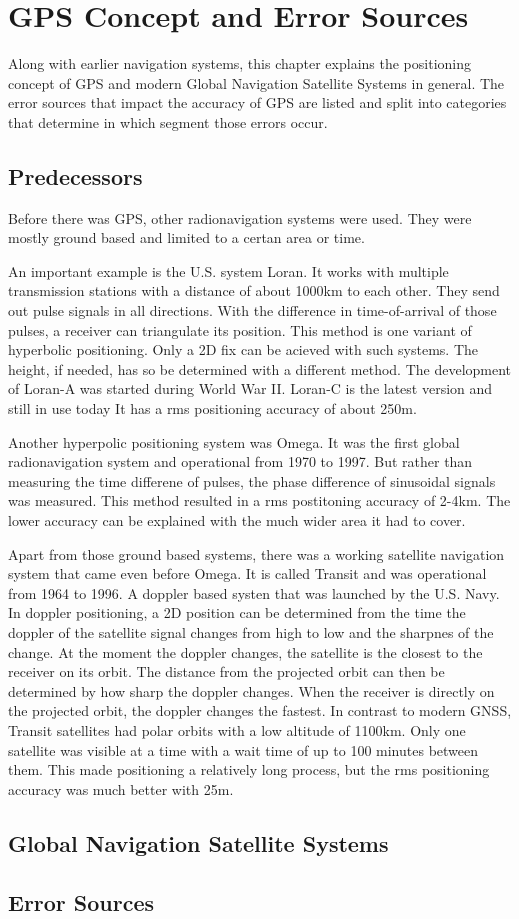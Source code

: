 \chapter{GPS Concept and Error Sources}

Along with earlier navigation systems, this chapter explains the positioning concept of GPS and modern Global Navigation Satellite Systems in general.
The error sources that impact the accuracy of GPS are listed and split into categories that determine in which segment those errors occur.

\section{Predecessors}
Before there was GPS, other radionavigation systems were used.
They were mostly ground based and limited to a certan area or time.

An important example is the U.S. system Loran.
It works with multiple transmission stations with a distance of about 1000km to each other.
They send out pulse signals in all directions.
With the difference in time-of-arrival of those pulses, a receiver can triangulate its position.
This method is one variant of hyperbolic positioning.
Only a 2D fix can be acieved with such systems.
The height, if needed, has so be determined with a different method.
The development of Loran-A was started during World War II.
Loran-C is the latest version and still in use today
It has a rms positioning accuracy of about 250m.

Another hyperpolic positioning system was Omega.
It was the first global radionavigation system and operational from 1970 to 1997.
But rather than measuring the time differene of pulses, the phase difference of sinusoidal signals was measured.
This method resulted in a rms postitoning accuracy of 2-4km.
The lower accuracy can be explained with the much wider area it had to cover.

Apart from those ground based systems, there was a working satellite navigation system that came even before Omega.
It is called Transit and was operational from 1964 to 1996.
A doppler based systen that was launched by the U.S. Navy.
In doppler positioning, a 2D position can be determined from the time the doppler of the satellite signal changes from high to low and the sharpnes of the change.
At the moment the doppler changes, the satellite is the closest to the receiver on its orbit.
The distance from the projected orbit can then be determined by how sharp the doppler changes.
When the receiver is directly on the projected orbit, the doppler changes the fastest.
In contrast to modern GNSS, Transit satellites had polar orbits with a low altitude of 1100km.
Only one satellite was visible at a time with a wait time of up to 100 minutes between them.
This made positioning a relatively long process, but the rms positioning accuracy was much better with 25m.


\section{Global Navigation Satellite Systems}

\section{Error Sources}

